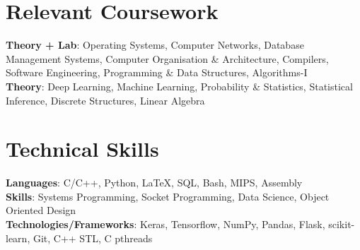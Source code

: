 \documentclass[letterpaper,9pt]{article}
\begin{document}
\section{Relevant Coursework}
    \begin{itemize}[leftmargin=0.15in, label={}]
      \small{\item{
        \textbf{Theory + Lab}{: Operating Systems, Computer Networks, Database Management Systems, Computer Organisation \& Architecture, Compilers, Software Engineering, Programming \& Data Structures, Algorithms-I} \\
        \textbf{Theory}{: Deep Learning, Machine Learning, Probability \& Statistics, Statistical Inference, Discrete Structures, Linear Algebra} \\
      }}
    \end{itemize}
    \vspace{-16pt}


%
\section{Technical Skills}
 \begin{itemize}[leftmargin=0.15in, label={}]
    \small{\item{
     \textbf{Languages}{: C/C++, Python, LaTeX, SQL, Bash, MIPS, Assembly} \\
     \textbf{Skills}{: Systems Programming, Socket Programming, Data Science, Object Oriented Design} \\
     \textbf{Technologies/Frameworks}{: Keras, Tensorflow, NumPy, Pandas, Flask, scikit-learn, Git, C++ STL, C pthreads} \\
    }}
 \end{itemize}
 \vspace{-16pt}
\end{document}
